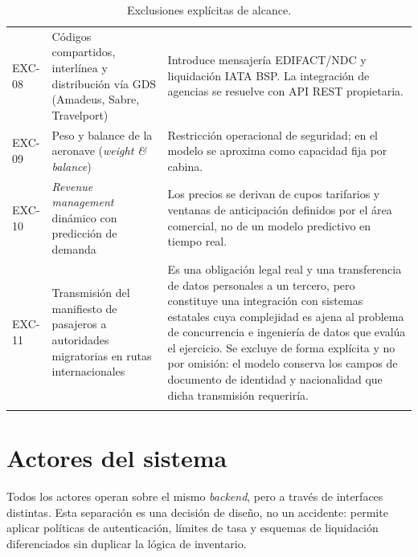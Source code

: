 \documentclass[10pt,letterpaper]{article}
\begin{document}
\begin{longtable}{@{}L{1.6cm} L{5.2cm} L{8.6cm}@{}}
EXC-08 & Códigos compartidos, interlínea y distribución vía GDS (Amadeus, Sabre, Travelport) & Introduce mensajería EDIFACT/NDC y liquidación IATA BSP. La integración de agencias se resuelve con API REST propietaria. \\
EXC-09 & Peso y balance de la aeronave (\emph{weight \& balance}) & Restricción operacional de seguridad; en el modelo se aproxima como capacidad fija por cabina. \\
EXC-10 & \emph{Revenue management} dinámico con predicción de demanda & Los precios se derivan de cupos tarifarios y ventanas de anticipación definidos por el área comercial, no de un modelo predictivo en tiempo real. \\
EXC-11 & Transmisión del manifiesto de pasajeros a autoridades migratorias en rutas internacionales & Es una obligación legal real y una transferencia de datos personales a un tercero, pero constituye una integración con sistemas estatales cuya complejidad es ajena al problema de concurrencia e ingeniería de datos que evalúa el ejercicio. Se excluye de forma explícita y no por omisión: el modelo conserva los campos de documento de identidad y nacionalidad que dicha transmisión requeriría. \\
\bottomrule
\caption{Exclusiones explícitas de alcance.}
\end{longtable}

\section{Actores del sistema}
\label{sec:actores}
Todos los actores operan sobre el mismo \emph{backend}, pero a través de interfaces distintas. Esta separación es una decisión de diseño, no un accidente: permite aplicar políticas de autenticación, límites de tasa y esquemas de liquidación diferenciados sin duplicar la lógica de inventario.
\end{document}
